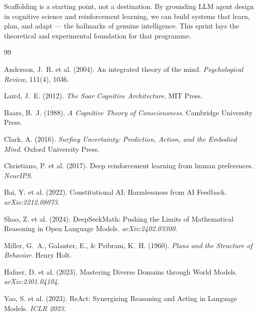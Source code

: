 \documentclass[12pt,a4paper]{article}
\begin{document}
Scaffolding is a starting point, not a destination. By grounding LLM agent design in
cognitive science and reinforcement learning, we can build systems that learn, plan, and
adapt — the hallmarks of genuine intelligence. This sprint lays the theoretical and
experimental foundation for that programme.

\newpage



\begin{thebibliography}{99}

Anderson, J.~R. et al. (2004).
\newblock An integrated theory of the mind.
\newblock \textit{Psychological Review}, 111(4), 1036.

Laird, J.~E. (2012).
\newblock \textit{The Soar Cognitive Architecture}.
\newblock MIT Press.

Baars, B.~J. (1988).
\newblock \textit{A Cognitive Theory of Consciousness}.
\newblock Cambridge University Press.

Clark, A. (2016).
\newblock \textit{Surfing Uncertainty: Prediction, Action, and the Embodied Mind}.
\newblock Oxford University Press.

Christiano, P. et al. (2017).
\newblock Deep reinforcement learning from human preferences.
\newblock \textit{NeurIPS}.

Bai, Y. et al. (2022).
\newblock Constitutional AI: Harmlessness from AI Feedback.
\newblock \textit{arXiv:2212.08073}.

Shao, Z. et al. (2024).
\newblock DeepSeekMath: Pushing the Limits of Mathematical Reasoning in Open Language Models.
\newblock \textit{arXiv:2402.03300}.

Miller, G.~A., Galanter, E., \& Pribram, K.~H. (1960).
\newblock \textit{Plans and the Structure of Behavior}.
\newblock Henry Holt.

Hafner, D. et al. (2023).
\newblock Mastering Diverse Domains through World Models.
\newblock \textit{arXiv:2301.04104}.

Yao, S. et al. (2023).
\newblock ReAct: Synergizing Reasoning and Acting in Language Models.
\newblock \textit{ICLR 2023}.

\end{thebibliography}
\end{document}
